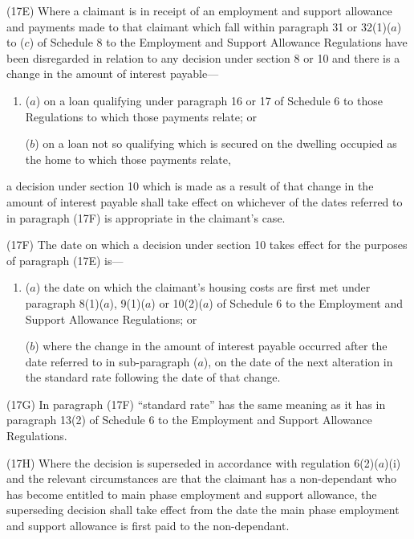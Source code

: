 \documentclass[12pt,a4paper]{article}
\begin{document}
(17E) Where a claimant is in receipt of an employment and support allowance and payments made to that claimant which fall within paragraph 31 or 32(1)($a$)  to ($c$)  of Schedule 8 to the Employment and Support Allowance Regulations have been disregarded in relation to any decision under section 8 or 10 and there is a change in the amount of interest payable—
\begin{enumerate}\item[]
($a$) on a loan qualifying under paragraph 16 or 17 of Schedule 6 to those Regulations to which those payments relate; or

($b$) on a loan not so qualifying which is secured on the dwelling occupied as the home to which those payments relate,
\end{enumerate}
a decision under section 10 which is made as a result of that change in the amount of interest payable shall take effect on whichever of the dates referred to in paragraph (17F) is appropriate in the claimant’s case.

(17F) The date on which a decision under section 10 takes effect for the purposes of paragraph (17E) is—
\begin{enumerate}\item[]
($a$) the date on which the claimant’s housing costs are first met under paragraph 8(1)($a$), 9(1)($a$)  or 10(2)($a$)  of Schedule 6 to the Employment and Support Allowance Regulations; or

($b$) where the change in the amount of interest payable occurred after the date referred to in sub-paragraph ($a$), on the date of the next alteration in the standard rate following the date of that change.
\end{enumerate}

(17G) In paragraph (17F) “standard rate” has the same meaning as it has in paragraph 13(2) of Schedule 6 to the Employment and Support Allowance Regulations.

\begin{sloppypar}
(17H) Where the decision is superseded in accordance with regulation 6(2)($a$)(i)  and the relevant circumstances are that the claimant has a non-dependant who has become entitled to main phase employment and support allowance, the superseding decision shall take effect from the date the main phase employment and support allowance is first paid to the non-dependant.
\end{sloppypar}
\end{document}
